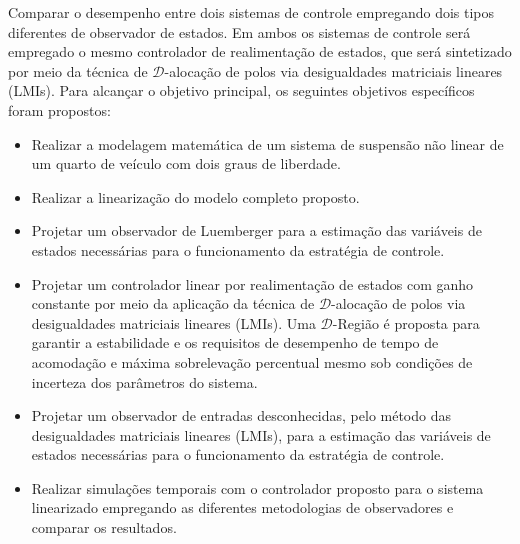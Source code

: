     Comparar o desempenho entre dois sistemas de controle empregando dois tipos diferentes de observador de estados. Em ambos os sistemas de controle será empregado o mesmo controlador de realimentação de estados, que será sintetizado por meio da técnica de \( \mathcal{D}\)-alocação de polos via desigualdades matriciais lineares (LMIs). 
    Para alcançar o objetivo principal, os seguintes objetivos específicos foram propostos:
    \begin{itemize}
        \item Realizar a modelagem matemática de um sistema de suspensão não linear de um quarto de veículo com dois graus de liberdade.
        \item Realizar a linearização do modelo completo proposto.
        \item Projetar um observador de Luemberger para a estimação das variáveis de estados necessárias para o funcionamento da estratégia de controle.
        \item Projetar um controlador linear por realimentação de estados com ganho constante por meio da aplicação da técnica de \( \mathcal{D}\)-alocação de polos via desigualdades matriciais lineares (LMIs). Uma \( \mathcal{D}\)-Região é proposta para garantir a estabilidade e os requisitos de desempenho de tempo de acomodação e máxima sobrelevação percentual mesmo sob condições de incerteza dos parâmetros do sistema.
        \item Projetar um observador de entradas desconhecidas, pelo método das desigualdades matriciais lineares (LMIs), para a estimação das variáveis de estados necessárias para o funcionamento da estratégia de controle.
        \item Realizar simulações temporais com o controlador proposto para o sistema linearizado empregando as diferentes metodologias de observadores e comparar os resultados.
    \end{itemize}
